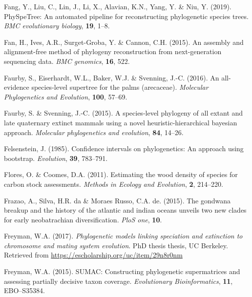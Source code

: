 \documentclass[]{article}
\begin{document}
\leavevmode\hypertarget{ref-fang2019physpetree}{}%
Fang, Y., Liu, C., Lin, J., Li, X., Alavian, K.N., Yang, Y. \& Niu, Y. (2019). PhySpeTree: An automated pipeline for reconstructing phylogenetic species trees. \emph{BMC evolutionary biology}, \textbf{19}, 1--8.

\leavevmode\hypertarget{ref-fan2015assembly}{}%
Fan, H., Ives, A.R., Surget-Groba, Y. \& Cannon, C.H. (2015). An assembly and alignment-free method of phylogeny reconstruction from next-generation sequencing data. \emph{BMC genomics}, \textbf{16}, 522.

\leavevmode\hypertarget{ref-faurby2016all}{}%
Faurby, S., Eiserhardt, W.L., Baker, W.J. \& Svenning, J.-C. (2016). An all-evidence species-level supertree for the palms (arecaceae). \emph{Molecular Phylogenetics and Evolution}, \textbf{100}, 57--69.

\leavevmode\hypertarget{ref-faurby2015species}{}%
Faurby, S. \& Svenning, J.-C. (2015). A species-level phylogeny of all extant and late quaternary extinct mammals using a novel heuristic-hierarchical bayesian approach. \emph{Molecular phylogenetics and evolution}, \textbf{84}, 14--26.

\leavevmode\hypertarget{ref-felsenstein1985confidence}{}%
Felsenstein, J. (1985). Confidence intervals on phylogenetics: An approach using bootstrap. \emph{Evolution}, \textbf{39}, 783--791.

\leavevmode\hypertarget{ref-flores2011estimating}{}%
Flores, O. \& Coomes, D.A. (2011). Estimating the wood density of species for carbon stock assessments. \emph{Methods in Ecology and Evolution}, \textbf{2}, 214--220.

\leavevmode\hypertarget{ref-frazao2015gondwana}{}%
Frazao, A., Silva, H.R. da \& Moraes Russo, C.A. de. (2015). The gondwana breakup and the history of the atlantic and indian oceans unveils two new clades for early neobatrachian diversification. \emph{PloS one}, \textbf{10}.

\leavevmode\hypertarget{ref-freyman2017phylogenetic}{}%
Freyman, W.A. (2017). \emph{Phylogenetic models linking speciation and extinction to chromosome and mating system evolution}. PhD thesis thesis, UC Berkeley. Retrieved from \url{https://escholarship.org/uc/item/29n8r0nm}

\leavevmode\hypertarget{ref-freyman2015sumac}{}%
Freyman, W.A. (2015). SUMAC: Constructing phylogenetic supermatrices and assessing partially decisive taxon coverage. \emph{Evolutionary Bioinformatics}, \textbf{11}, EBO--S35384.
\end{document}
